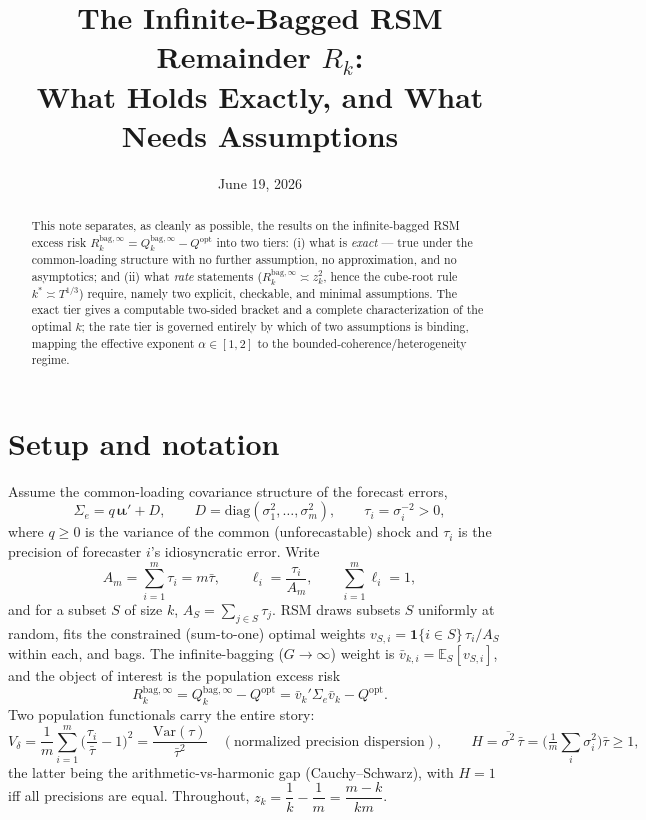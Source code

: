 \documentclass[11pt]{article}
\title{The Infinite-Bagged RSM Remainder $R_k$:\\
What Holds Exactly, and What Needs Assumptions}
\date{June 19, 2026}
\newcommand{\Sig}{\Sigma_e}
\newcommand{\E}{\mathbb{E}}
\newcommand{\Var}{\mathrm{Var}}
\newcommand{\diag}{\mathrm{diag}}
\newcommand{\Rk}{R_k^{\mathrm{bag},\infty}}
\newcommand{\Qopt}{Q^{\mathrm{opt}}}
\newcommand{\iotab}{\bm{\iota}}
\begin{document}
\maketitle

\begin{abstract}
This note separates, as cleanly as possible, the results on the infinite-bagged
RSM excess risk $\Rk=Q_k^{\mathrm{bag},\infty}-\Qopt$ into two tiers: (i) what is
\emph{exact} --- true under the common-loading structure with no further assumption,
no approximation, and no asymptotics; and (ii) what \emph{rate} statements
($\Rk\asymp z_k^2$, hence the cube-root rule $k^\ast\asymp T^{1/3}$) require, namely
two explicit, checkable, and minimal assumptions. The exact tier gives a computable
two-sided bracket and a complete characterization of the optimal $k$; the rate tier
is governed entirely by which of two assumptions is binding, mapping the effective
exponent $\alpha\in[1,2]$ to the bounded-coherence/heterogeneity regime.
\end{abstract}

\section{Setup and notation}
Assume the common-loading covariance structure of the forecast errors,
\[
  \Sig = q\,\iotab\iotab' + D,\qquad D=\diag(\sigma_1^2,\dots,\sigma_m^2),
  \qquad \tau_i=\sigma_i^{-2}>0,
\]
where $q\ge0$ is the variance of the common (unforecastable) shock and $\tau_i$ is the
precision of forecaster $i$'s idiosyncratic error. Write
\[
  A_m=\sum_{i=1}^m\tau_i=m\bar\tau,\qquad \ell_i=\frac{\tau_i}{A_m},
  \qquad \sum_{i=1}^m\ell_i=1,
\]
and for a subset $S$ of size $k$, $A_S=\sum_{j\in S}\tau_j$. RSM draws subsets $S$
uniformly at random, fits the constrained (sum-to-one) optimal weights
$v_{S,i}=\mathbf 1\{i\in S\}\,\tau_i/A_S$ within each, and bags. The
infinite-bagging ($G\to\infty$) weight is $\bar v_{k,i}=\E_S[v_{S,i}]$, and the object
of interest is the population excess risk
\[
  \Rk=Q_k^{\mathrm{bag},\infty}-\Qopt=\bar v_k'\Sig\bar v_k-\Qopt .
\]
Two population functionals carry the entire story:
\[
  V_\delta=\frac1m\sum_{i=1}^m\Big(\frac{\tau_i}{\bar\tau}-1\Big)^2
  =\frac{\Var(\tau)}{\bar\tau^2}\quad(\text{normalized precision dispersion}),
  \qquad
  H=\overline{\sigma^2}\,\bar\tau=\Big(\tfrac1m\textstyle\sum_i\sigma_i^2\Big)\bar\tau\ge1,
\]
the latter being the arithmetic-vs-harmonic gap (Cauchy--Schwarz), with $H=1$ iff all
precisions are equal. Throughout, $z_k=\dfrac1k-\dfrac1m=\dfrac{m-k}{km}$.
\end{document}
